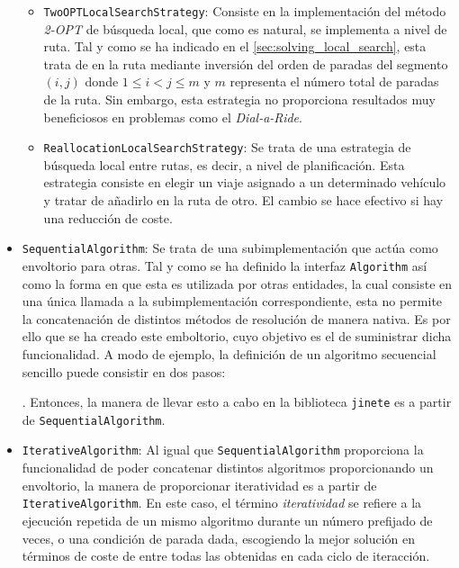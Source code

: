 \documentclass{subfiles}
\begin{document}
\begin{itemize}
\begin{itemize}
                      \item \texttt{TwoOPTLocalSearchStrategy}: Consiste en la implementación del método \emph{2-OPT} de búsqueda local, que como es natural, se implementa a nivel de ruta. Tal y como se ha indicado en el \cref{sec:solving_local_search}, esta trata de  en la ruta mediante inversión del orden de paradas del segmento $(i, j)$ donde $1 \leq i < j \leq m$ y $m$ representa el número total de paradas de la ruta. Sin embargo, esta estrategia no proporciona resultados muy beneficiosos en problemas como el \emph{Dial-a-Ride}.

                      \item \texttt{ReallocationLocalSearchStrategy}: Se trata de una estrategia de búsqueda local entre rutas, es decir, a nivel de planificación. Esta estrategia consiste en elegir un viaje asignado a un determinado vehículo y tratar de añadirlo en la ruta de otro. El cambio se hace efectivo si hay una reducción de coste.

                  \end{itemize}

              \item \texttt{SequentialAlgorithm}: Se trata de una subimplementación que actúa como envoltorio para otras. Tal y como se ha definido la interfaz \texttt{Algorithm} así como la forma en que esta es utilizada por otras entidades, la cual consiste en una única llamada a la subimplementación correspondiente, esta no permite la concatenación de distintos métodos de resolución de manera nativa. Es por ello que se ha creado este emboltorio, cuyo objetivo es el de suministrar dicha funcionalidad. A modo de ejemplo, la definición de un algoritmo secuencial sencillo puede consistir en dos pasos: . Entonces, la manera de llevar esto a cabo en la biblioteca \texttt{jinete} es a partir de \texttt{SequentialAlgorithm}.

              \item \texttt{IterativeAlgorithm}: Al igual que \texttt{SequentialAlgorithm} proporciona la funcionalidad de poder concatenar distintos algoritmos proporcionando un envoltorio, la manera de proporcionar iteratividad es a partir de \texttt{IterativeAlgorithm}. En este caso, el término \emph{iteratividad} se refiere a la ejecución repetida de un mismo algoritmo durante un número prefijado de veces, o una condición de parada dada, escogiendo la mejor solución en términos de coste de entre todas las obtenidas en cada ciclo de iteracción.


\end{itemize}
\end{document}
